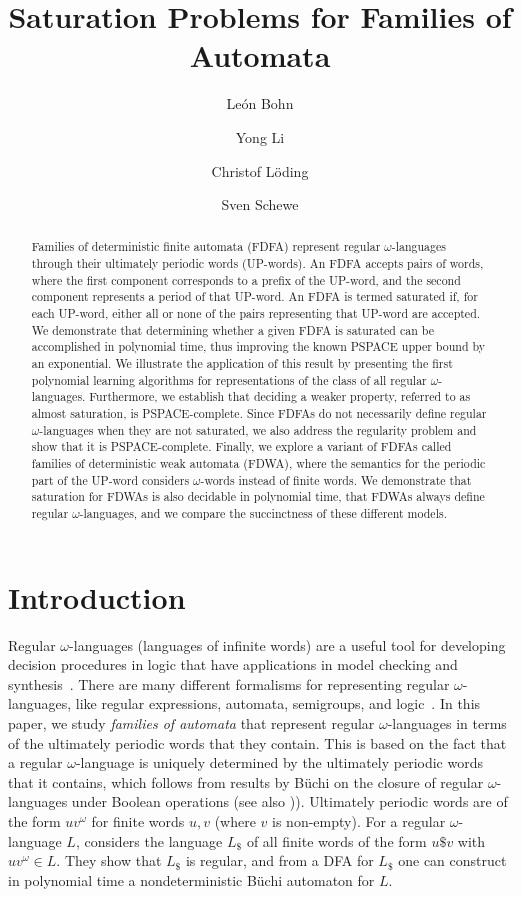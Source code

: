 \documentclass[a4paper,USenglish,cleveref,autoref,thm-restate]{lipics-v2021}
\title{Saturation Problems for Families of Automata}
\author{León Bohn}{RWTH Aachen University, Germany}{bohn@lics.rwth-aachen.de}{https://orcid.org/0000-0003-0881-3199}{Supported by DFG grant LO 1174/7-1}
\author{Yong Li}{Key Laboratory of System Software (Chinese Academy of Sciences) and State Key Laboratory of Computer Science, Institute of Software, Chinese Academy of Sciences, PRC}{liyong@ios.ac.cn}{https://orcid.org/0000-0002-7301-9234}{Supported by National Natural Science Foundation of China (Grant No. 62102407)}
\author{Christof Löding}{RWTH Aachen University, Germany}{loeding@automata.rwth-aachen.de}{https://orcid.org/0000-0002-1529-2806}{}
\author{Sven Schewe}{University of Liverpool, UK}{sven.schewe@liverpool.ac.uk}{https://orcid.org/0000-0002-9093-9518}{Supported by the EPSRC through projects EP/X03688X/1 and EP/X042596/1}
\newcommand{\PSPACE}{\textsf{PSPACE}\xspace}
\begin{document}
\maketitle


\begin{abstract}
Families of deterministic finite automata (FDFA) represent regular $\omega$-languages through their ultimately periodic words (UP-words).
An FDFA accepts pairs of words, where the first component corresponds to a prefix of the UP-word, and the second component represents a period of that UP-word.
An FDFA is termed saturated if, for each UP-word, either all or none of the pairs representing that UP-word are accepted.
We demonstrate that determining whether a given FDFA is saturated can be accomplished in polynomial time, thus improving the known \PSPACE upper bound by an exponential.
We illustrate the application of this result by presenting the first polynomial learning algorithms for representations of the class of all regular $\omega$-languages.
Furthermore, we establish that deciding a weaker property, referred to as almost saturation, is \PSPACE-complete.
Since FDFAs do not necessarily define regular $\omega$-languages when they are not saturated, we also address the regularity problem and show that it is \PSPACE-complete.
Finally, we explore a variant of FDFAs called families of deterministic weak automata (FDWA), where the semantics for the periodic part of the UP-word considers $\omega$-words instead of finite words. 
We demonstrate that saturation for FDWAs is also decidable in polynomial time, that FDWAs always define regular $\omega$-languages, and we compare the succinctness of these different models.
\end{abstract} \section{Introduction}
\label{section:introduction}
Regular $\omega$-languages (languages of infinite words) are a useful tool for developing decision procedures in logic that have applications in model checking and synthesis~\cite{BaierK2008,Thomas09}. There are many different formalisms for representing regular $\omega$-languages, like regular expressions, automata, semigroups, and logic~\cite{Thomas90,PerrinP04}. In this paper, we study \emph{families of automata} that represent regular $\omega$-languages in terms of the ultimately periodic words that they contain.  This is based on the fact that a regular $\omega$-language is uniquely determined by the ultimately periodic words that it contains, which follows from results by Büchi \cite{Buchi62} on the closure of regular $\omega$-languages under Boolean operations (see also \cite[Fact~1]{CalbrixNP93})).  Ultimately periodic words are of the form $uv^\omega$ for finite words $u,v$ (where $v$ is non-empty). For a regular $\omega$-language $L$, \cite{CalbrixNP93} considers the language $L_\$$ of all finite words of the form $u\$ v$ with $uv^\omega \in L$. They show that $L_\$$ is regular, and from a DFA for $L_\$$ one can construct in polynomial time a nondeterministic B\"uchi automaton for $L$.
\end{document}
